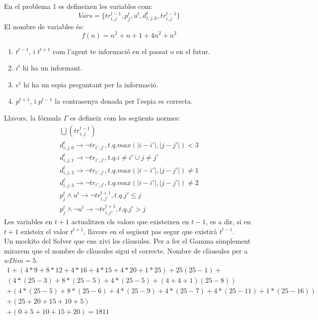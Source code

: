 
En el problema 1 es defineixen les variables com:
\[
Vars = \{tr_{i, j}^{t-1}, p_j^t, u^t, d_{i, j, k}^t, tr_{i, j}^{t-1}\}
\]
El nombre de variables és:
\[
f(n) = n^2 + n + 1 + 4n^2 + n^2
\]
\begin{enumerate}
	\item $t^{t-1}$, i $t^{t+1}$ com l'agent te informació en el passat o en el futur.
	\item $i^t$ hi ha un informant.
	\item $e^t$ hi ha un espia preguntant per la informació.
	\item $p^{t+1}$, i $p^{t-1}$ la contrasenya donada per l'espia es correcta.
\end{enumerate}
Llavors, la fórmula $\Gamma$ es defineix com les següents normes:
\begin{gather}
\bigcup(tr_{i, j}^{t-1})\\
d_{i, j, 0}^t \rightarrow \neg tr_{i', j'}, t.q. max(|i - i'|, |j - j'|) < 3\\
d_{i, j, 1}^t \rightarrow \neg tr_{i', j'}, t.q. i \neq i' \cup j \neq j'\\
d_{i, j, 2}^t \rightarrow \neg tr_{i', j'}, t.q. max(|i - i'|, |j - j'|) \neq 1\\
d_{i, j, 3}^t \rightarrow \neg tr_{i', j'}, t.q. max(|i - i'|, |j - j'|) \neq 2\\
p_j^t \wedge u^t \rightarrow \neg tr_{i, j'}^{t+1}, t.q. j' \leq j\\
p_j^t \wedge \neg u^t \rightarrow \neg tr_{i, j'}^{t+1}, t.q. j' > j
\end{gather}
Les variables en $t + 1$ actualitzen els valors que existeixen en $t-1$, es a dir, si 
en $t+1$ existeix el valor $t^{t+1}$, llavors en el següent pas segur que existirà $t^{t-1}$.\\

Un mockito del Solver que ens xivi les clàusules.
Per a fer el Gamma simplement mirarem que el nombre de clàusules sigui
el correcte. Nombre de clàusules per a $wDim = 5$.
\begin{gather}
	1 
	+ (4*9 + 8*12 +4*16 + 4*15 + 4*20 + 1*25) 
	+ 25(25 - 1) +\\
	(4 * (25 - 3) + 8*(25-5) + 4*(25-5)+ (4+4+1)(25-8))\\
	+ (4 * (25 - 5) + 8*(25 - 6) + 4*(25-9)+4*(25 -7) + 4*(25-11)+1*(25 - 16))\\
	+ (25 + 20 + 15 + 10 + 5)\\
	+ (0 + 5 + 10 + 15 + 20)
	= 1811
\end{gather}
